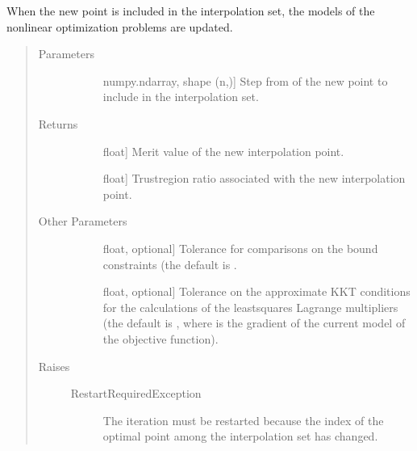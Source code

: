 \documentclass[letterpaper,10pt,english]{sphinxmanual}
\begin{document}
\begin{fulllineitems}
\begin{fulllineitems}
\sphinxAtStartPar
When the new point is included in the interpolation set, the models of
the nonlinear optimization problems are updated.
\begin{quote}\begin{description}
\item[{Parameters}] \leavevmode\begin{description}
\item[{}] \leavevmode{[}numpy.ndarray, shape (n,){]}
\sphinxAtStartPar
Step from  of the new point to include in the interpolation
set.

\end{description}

\item[{Returns}] \leavevmode\begin{description}
\item[{}] \leavevmode{[}float{]}
\sphinxAtStartPar
Merit value of the new interpolation point.

\item[{}] \leavevmode{[}float{]}
\sphinxAtStartPar
Trust\sphinxhyphen{}region ratio associated with the new interpolation point.

\end{description}

\item[{Other Parameters}] \leavevmode\begin{description}
\item[{}] \leavevmode{[}float, optional{]}
\sphinxAtStartPar
Tolerance for comparisons on the bound constraints (the default is
.

\item[{}] \leavevmode{[}float, optional{]}
\sphinxAtStartPar
Tolerance on the approximate KKT conditions for the calculations of
the least\sphinxhyphen{}squares Lagrange multipliers (the default is
, where  is the
gradient of the current model of the objective function).

\end{description}

\item[{Raises}] \leavevmode\begin{description}
\item[{RestartRequiredException}] \leavevmode
\sphinxAtStartPar
The iteration must be restarted because the index of the optimal
point among the interpolation set has changed.


\end{description}
\end{description}
\end{quote}
\end{fulllineitems}
\end{fulllineitems}
\end{document}
